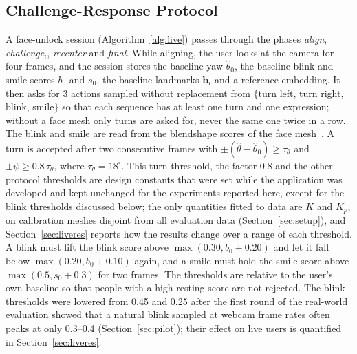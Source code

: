 \documentclass{ieeeaccess}
\begin{document}
\subsection{Challenge-Response Protocol}\label{sec:protocol}
A face-unlock session (Algorithm~\ref{alg:live}) passes through the phases \emph{align}, \emph{challenge}$_i$, \emph{recenter} and \emph{final}. While aligning, the user looks at the camera for four frames, and the session stores the baseline yaw $\hat\theta_0$, the baseline blink and smile scores $b_0$ and $s_0$, the baseline landmarks $\mathbf{b}_i$ and a reference embedding. It then asks for 3 actions sampled without replacement from $\{$turn left, turn right, blink, smile$\}$ so that each sequence has at least one turn and one expression; without a face mesh only turns are asked for, never the same one twice in a row. The blink and smile are read from the blendshape scores of the face mesh~\cite{kartynnik2019facemesh}. A turn is accepted after two consecutive frames with $\pm(\hat\theta-\hat\theta_0)\ge\tau_\theta$ and $\pm\psi\ge0.8\,\tau_\theta$, where $\tau_\theta=18^\circ$. This turn threshold, the factor 0.8 and the other protocol thresholds are design constants that were set while the application was developed and kept unchanged for the experiments reported here, except for the blink thresholds discussed below; the only quantities fitted to data are $K$ and $K_p$, on calibration meshes disjoint from all evaluation data (Section~\ref{sec:setup}), and Section~\ref{sec:liveres} reports how the results change over a range of each threshold. A blink must lift the blink score above $\max(0.30,b_0+0.20)$ and let it fall below $\max(0.20,b_0+0.10)$ again, and a smile must hold the smile score above $\max(0.5,s_0+0.3)$ for two frames. The thresholds are relative to the user's own baseline so that people with a high resting score are not rejected. The blink thresholds were lowered from 0.45 and 0.25 after the first round of the real-world evaluation showed that a natural blink sampled at webcam frame rates often peaks at only 0.3--0.4 (Section~\ref{sec:pilot}); their effect on live users is quantified in Section~\ref{sec:liveres}.
\end{document}
